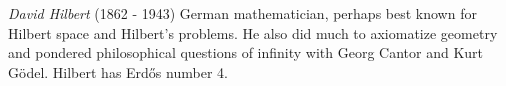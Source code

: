 \documentclass[12pt]{article}
\begin{document}
\emph{David Hilbert} (1862 - 1943) German mathematician, perhaps best known for Hilbert space and Hilbert's problems. He also did  much to axiomatize geometry and pondered philosophical questions of infinity with Georg Cantor and Kurt G\"odel. Hilbert has Erd\H{o}s number 4.
\end{document}
